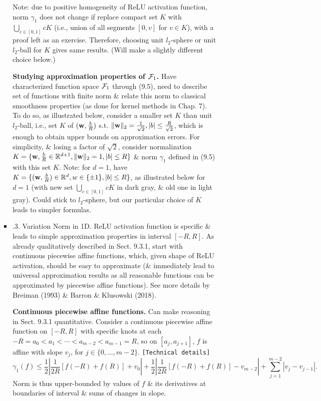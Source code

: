 \documentclass{article}
\begin{document}
\begin{enumerate}
\begin{itemize}
\begin{itemize}
\begin{itemize}
				Note: due to positive homogeneity of ReLU activation function, norm $\gamma_1$ does not change if replace compact set $K$ with $\bigcup_{c\in[0,1]} cK$ (i.e., union of all segments $[0,v]$ for $v\in K$), with a proof left as an exercise. Therefore, choosing unit $l_2$-sphere or unit $l_2$-ball for $K$ gives same results. (Will make a slightly different choice below.)
				
				{\bf Studying approximation properties of ${\cal F}_1$.} Have characterized function space ${\cal F}_1$ through (9.5), need to describe set of functions with finite norm \& relate this norm to classical smoothness properties (as done for kernel methods in Chap. 7). To do so, as illustrated below, consider a smaller set $K$ than unit $l_2$-ball, i.e., set $K$ of $({\bf w},\frac{b}{R})$ s.t. $\|{\bf w}\|_2 = \frac{1}{\sqrt{2}},|b|\le\frac{R}{\sqrt{2}}$, which is enough to obtain upper bounds on approximation errors. For simplicity, \& losing a factor of $\sqrt{2}$, consider normalization $K = \{{\bf w},\frac{b}{R}\in\mathbb{R}^{d+1},\|{\bf w}\|_2 = 1,|b|\le R\}$ \& norm $\gamma_1$ defined in (9.5) with this set $K$. Note: for $d = 1$, have $K = \{({\bf w},\frac{b}{R})\in\mathbb{R}^d,w\in\{\pm1\},|b|\le R\}$, as illustrated below for $d = 1$ (with new set $\bigcup_{c\in[0,1]} cK$ in dark gray, \& old one in light gray). Could stick to $l_2$-sphere, but our particular choice of $K$ leads to simpler formulas.				
				\item {.3. Variation Norm in 1D.} ReLU activation function is specific \& leads to simple approximation properties in interval $[-R,R]$. As already qualitatively described in Sect. 9.3.1, start with continuous piecewise affine functions, which, given shape of ReLU activation, should be easy to approximate (\& immediately lead to universal approximation results as all reasonable functions can be approximated by piecewise affine functions). See more details by Breiman (1993) \& Barron \& Klusowski (2018).
				
				{\bf Continuous piecewise affine functions.} Can make reasoning in Sect. 9.3.1 quantitative. Consider a continuous piecewise affine function on $[-R,R]$ with specific knots at each $-R = a_0 < a_1 < \cdots < a_{m-2} < a_{m-1} = R$, so on $[a_j,a_{j+1}]$, $f$ is affine with slope $v_j$, for $j\in\{0,\ldots,m - 2\}$. {\tt[Technical details]}
				\begin{equation}
					\gamma_1(f)\le\frac{1}{2}|\frac{1}{2R}[f(-R) + f(R)] + v_0| + \frac{1}{2}|\frac{1}{2R}[f(-R) + f(R)] - v_{m-2}| + \sum_{j=1}^{m-2} |v_j - v_{j-1}|.
				\end{equation}
				Norm is thus upper-bounded by values of $f$ \& its derivatives at boundaries of interval \& sums of changes in slope.
				

\end{itemize}
\end{itemize}
\end{itemize}
\end{enumerate}
\end{document}
